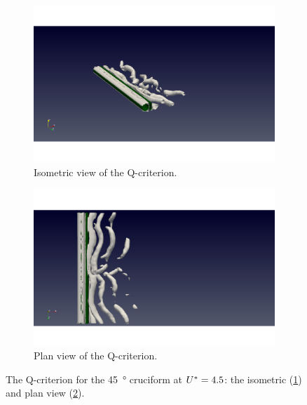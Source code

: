 \documentclass[oneside]{utmthesis}
\begin{document}
\begin{figure}
  \centering
  \begin{subfigure}[h]{0.9\textwidth}
    \includegraphics[width=\textwidth]{figs/qIso000U02}
    \caption{Isometric view of the Q-criterion.}
    \label{fig:qIso000U02}
  \end{subfigure}

  \begin{subfigure}[h]{0.9\textwidth}
    \includegraphics[width=\textwidth]{figs/qTop000U02}
    \caption{Plan view of the Q-criterion.}
    \label{fig:qTop000U02}
  \end{subfigure}

  \caption{The Q-criterion for the \SI{45}{\degree} cruciform at $U^{*} = 4.5$: the isometric (\ref{fig:qIso000U02}) and plan view (\ref{fig:qTop000U02}).} \label{fig:qCrit000U02}
\end{figure}
\end{document}
